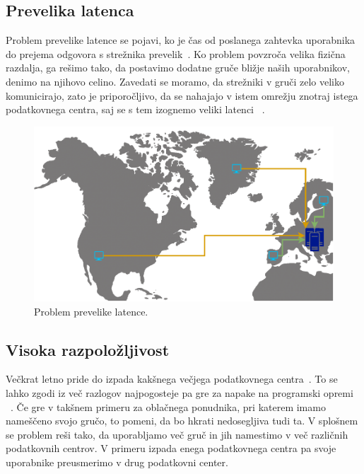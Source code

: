 \documentclass[a4paper, 12pt]{book}
\begin{document}
\subsection{Prevelika latenca}
Problem prevelike latence se pojavi, ko je čas od poslanega zahtevka uporabnika do prejema odgovora s strežnika prevelik~\cite{minimizing-latency}.
Ko problem povzroča velika fizična razdalja, ga rešimo tako, da postavimo dodatne gruče bližje naših uporabnikov, denimo na njihovo celino.
Zavedati se moramo, da strežniki v gruči zelo veliko komunicirajo, zato je priporočljivo, da se nahajajo v istem omrežju znotraj istega podatkovnega centra, saj se s tem izognemo veliki latenci ~\cite{kube-and-edge}.
\begin{figure}[h]
\begin{center}
  \includegraphics[width=1.0\textwidth]{images/problem-prevelike-latence.pdf}
\end{center}
\caption{Problem prevelike latence.}
\label{problem-prevelike-latence}
\end{figure}
\subsection{Visoka razpoložljivost}
Večkrat letno pride do izpada kakšnega večjega podatkovnega centra~\cite{ha-systems}. 
To se lahko zgodi iz več razlogov najpogosteje pa gre za napake na programski opremi ~\cite{common-outages}.
Če gre v takšnem primeru za oblačnega ponudnika, pri katerem imamo nameščeno svojo gručo, to pomeni, da bo hkrati nedosegljiva tudi ta.
V splošnem se problem reši tako, da uporabljamo več gruč in jih namestimo v več različnih podatkovnih centrov.
V primeru izpada enega podatkovnega centra pa svoje uporabnike preusmerimo v drug podatkovni center.
\end{document}
